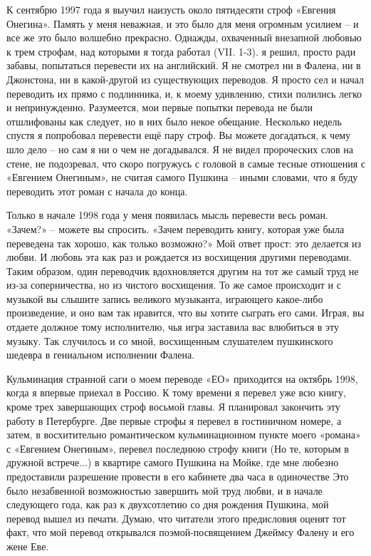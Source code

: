 \documentclass[../main.tex]{subfiles}
\begin{document}
К сентябрю 1997 года я выучил наизусть около пятидесяти строф «Евгения Онегина». Память у меня неважная, и это было для меня огромным усилием \--- и все же это было волшебно прекрасно. Однажды, охваченный внезапной любовью к трем строфам, над которыми я тогда работал (VII. 1-3). я решил, просто ради забавы, попытаться перевести их на английский. Я не смотрел ни в Фалена, ни в Джонстона, ни в какой-другой из существующих переводов. Я просто сел и начал переводить их прямо с подлинника, и, к моему удивлению, стихи полились легко и непринужденно. Разумеется, мои первые попытки перевода не были отшлифованы как следует, но в них было некое обещание. Несколько недель спустя я попробовал перевести ещё пару строф. Вы можете догадаться, к чему шло дело \--- но сам я ни о чем не догадывался. Я не видел пророческих слов на стене, не подозревал, что скоро погружусь с головой в самые тесные отношения с «Евгением Онегиным», не считая самого Пушкина \--- иными словами, что я буду переводить этот роман с начала до конца.

Только в начале 1998 года у меня появилась мысль перевести весь роман.
«Зачем?» \--- можете вы спросить. «Зачем переводить книгу, которая уже была переведена так хорошо, как только возможно?» Мой ответ прост: это делается из любви. И любовь эта как раз и рождается из восхищения другими переводами. Таким образом, один переводчик вдохновляется другим на тот же самый труд не из-за соперничества, но из чистого восхищения. То же самое происходит и с музыкой вы слышите запись великого музыканта, играющего какое-либо произведение, и оно вам так нравится, что вы хотите сыграть его сами. Играя, вы отдаете должное тому исполнителю, чья игра заставила вас влюбиться в эту музыку. Так случилось и со мной, восхищенным слушателем пушкинского шедевра в гениальном исполнении Фалена.

Кульминация странной саги о моем переводе «ЕО» приходится на октябрь 1998, когда я впервые приехал в Россию. К тому времени я перевел уже всю книгу, кроме трех завершающих строф восьмой главы. Я планировал закончить эту работу в Петербурге. Две первые строфы я перевел в гостиничном номере, а затем, в восхитительно романтическом кульминационном пункте моего «романа» с «Евгением Онегиным», перевел последнюю строфу книги (Но те, которым в дружной встрече...) в квартире самого Пушкина на Мойке, где мне любезно предоставили разрешение провести в его кабинете два часа в одиночестве Это было незабвенной возможностью завершить мой труд любви, и в начале следующего года, как раз к двухсотлетию со дня рождения Пушкина, мой перевод вышел из печати. Думаю, что читатели этого предисловия оценят тот факт, что мой перевод открывался поэмой-посвящением Джеймсу Фалену и его жене Еве.
\end{document}
